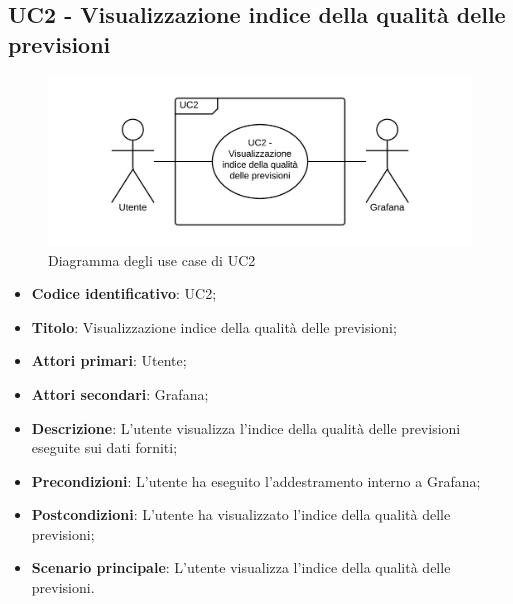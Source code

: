 \subsection{UC2 - Visualizzazione indice della qualità delle previsioni}
\begin{figure}[H]
\includegraphics{img/UC2_-_Visualizzazione_indice_della_qualit_delle_previsioni.png}
\caption{Diagramma degli use case di UC2}
\end{figure}
\begin{itemize}
	\item \textbf{Codice identificativo}: UC2;
	\item \textbf{Titolo}: Visualizzazione indice della qualità delle previsioni;
	\item \textbf{Attori primari}: Utente;
	\item \textbf{Attori secondari}: Grafana\glo;
	\item \textbf{Descrizione}: L'utente visualizza l'indice della qualità delle previsioni eseguite sui dati forniti;
	\item \textbf{Precondizioni}: L'utente ha eseguito l'addestramento interno a Grafana;
	\item \textbf{Postcondizioni}: L'utente ha visualizzato l'indice della qualità delle previsioni;
	\item \textbf{Scenario principale}: L'utente visualizza l'indice della qualità delle previsioni.
\end{itemize}